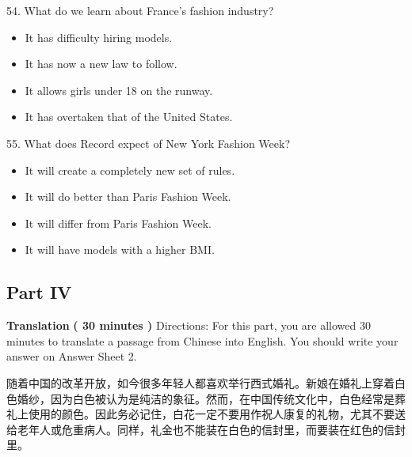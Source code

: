 \documentclass[UTF8,11pt]{ctexart}
\begin{document}
54. What do we learn about France's fashion industry?


\begin{itemize}[leftmargin=2em,itemsep=.2em,topsep=.4em]\item[A.] It has difficulty hiring models.
\item[B.] It has now a new law to follow.
\item[C.] It allows girls under 18 on the runway.
\item[D.] It has overtaken that of the United States.
\end{itemize}

55. What does Record expect of New York Fashion Week?


\begin{itemize}[leftmargin=2em,itemsep=.2em,topsep=.4em]\item[A.] It will create a completely new set of rules.
\item[B.] It will do better than Paris Fashion Week.
\item[C.] It will differ from Paris Fashion Week.
\item[D.] It will have models with a higher BMI.
\end{itemize}

\subsection*{\textbf{Part} IV}


\textbf{Translation} \textbf{( 30 minutes )} Directions: For this part, you are allowed 30 minutes to translate a passage from Chinese into English. You should write your answer on Answer Sheet 2.


随着中国的改革开放，如今很多年轻人都喜欢举行西式婚礼。新娘在婚礼上穿着白色婚纱，因为白色被认为是纯洁的象征。然而，在中国传统文化中，白色经常是葬礼上使用的颜色。因此务必记住，白花一定不要用作祝人康复的礼物，尤其不要送给老年人或危重病人。同样，礼金也不能装在白色的信封里，而要装在红色的信封里。
\end{document}
